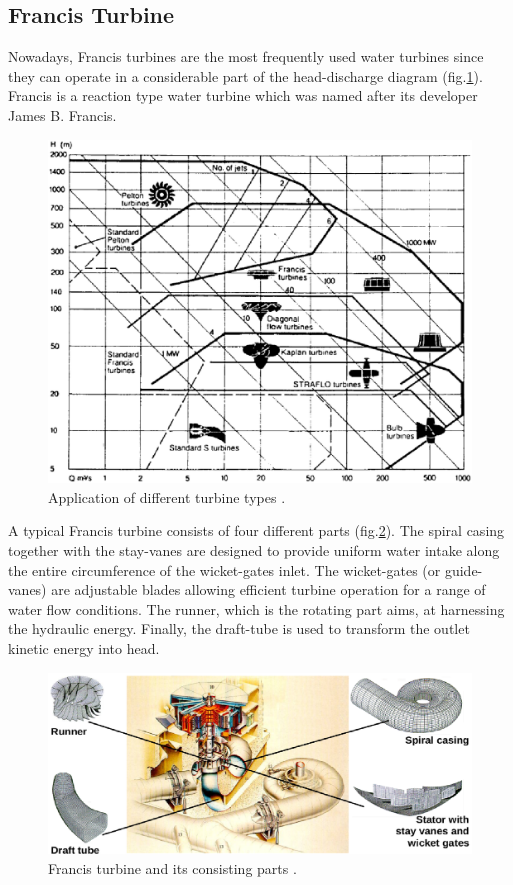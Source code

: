 \subsection{Francis Turbine}
Nowadays, Francis turbines are the most frequently used water turbines since they can operate in a considerable part of the head-discharge diagram (fig.\ref{range}). Francis is a reaction type water turbine which was named after its developer James B. Francis. 

\begin{figure}[h!]
\centering
\includegraphics[width=140mm]{range2.eps} 
\caption{Application of different turbine types \cite{papanto}.}
\label{range}
\end{figure}

A typical Francis turbine consists of four different parts (fig.\ref{francis1}). The spiral casing together with the stay-vanes are designed to provide uniform water intake along the entire circumference of the wicket-gates inlet. The wicket-gates (or guide-vanes) are adjustable blades allowing efficient turbine operation for a range of water flow conditions. The runner, which is the rotating part aims, at harnessing the hydraulic energy. Finally, the draft-tube is used to transform the outlet kinetic energy into head.

\begin{figure}[h!]
\centering
\includegraphics[width=150mm]{francis1.eps} 
\caption{Francis turbine and its consisting parts \cite{andritz}.}
\label{francis1}
\end{figure}

